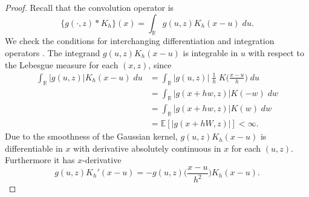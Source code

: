 \documentclass[aos]{imsart}
\newcommand{\R}{\mathbb{R}}
\newcommand{\E}{\mathbb{E}}
\begin{document}
	\begin{proof}
		Recall that the convolution operator is \begin{equation*}
			\{g(\cdot,z)*K_h\}(x) = \int_\R g(u,z) K_h(x-u)\; du.
		\end{equation*}
		We check the conditions for interchanging differentiation and integration operators \citep[Thm.~20.4]{AliprantisAnalysis}. The integrand $g(u,z) K_h(x-u)$ is integrable in $u$ with respect to the Lebesgue measure for each $(x,z)$, since \begin{align*}
			\int_\R |g(u,z)| K_h(x-u)\; du &= \int_{\R} |g(u,z)| \;\frac1h\; K\bigg(\frac{x-u}{h}\bigg) \; du\\
			&= \int_{\R} |g(x+hw,z)| K(-w) \; dw\\
			&= \int_{\R} |g(x+hw,z)| K(w) \; dw\\
			&= \E[|g(x+hW,z)|] < \infty.
		\end{align*} 
		Due to the smoothness of the Gaussian kernel, $g(u,z) K_h(x-u)$ is differentiable in $x$ with derivative
		absolutely continuous in $x$ for each $(u,z)$. Furthermore it has $x$-derivative 
		\begin{equation*}
			g(u,z) K_h'(x-u) = - g(u,z) \bigg(\frac{x-u}{h^2}\bigg) K_h(x-u).
		\end{equation*}
		

\end{proof}
\end{document}
